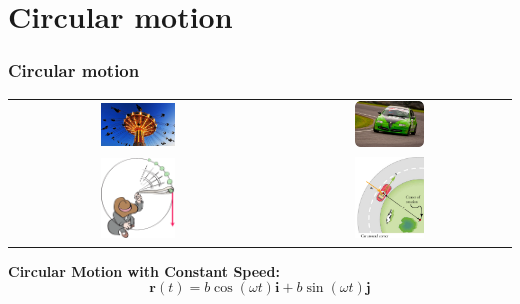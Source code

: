\documentclass[10pt]{beamer}
\begin{document}
\section{Circular motion}
\begin{frame}
\frametitle{Circular motion}
\centering
\begin{tabular}{cc}
\includegraphics[width=0.3\textwidth]{circular3.jpg}\hspace{2em} &\includegraphics[width=0.3\textwidth]{circular4.jpg}\\
\includegraphics[width=0.3\textwidth]{circular2.png}\hspace{2em} &\includegraphics[width=0.3\textwidth]{circular5.jpg}
\end{tabular}\pause

{\bf Circular Motion with Constant Speed:}
 \[ \mathbf r(t) = b\cos(\omega t)\mathbf i + b\sin(\omega t)\mathbf j \]

\end{frame}
 
\end{document}
